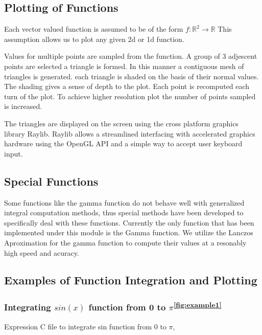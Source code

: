 \documentclass[12pt]{article}
\begin{document}
\subsection{Plotting of Functions}

Each vector valued function is assumed to be of the form $f:\mathbb{R}^2 \rightarrow \mathbb{R}$ This assumption allows us to plot any given 2d or 1d function.

Values for multiple points are sampled from the function. A group of 3 adjescent points are selected a triangle is formed. In this manner a contiguous mesh of
triangles is generated. each triangle is shaded on the basis of their normal values. The shading gives a sense of depth to the plot. Each point is recomputed each
turn of the plot. To achieve higher resolution plot the number of points sampled is increased.

The triangles are displayed on the screen using the cross platform graphics library Raylib\cite{ad}. Raylib allows a streamlined interfacing with accelerated graphics
hardware using the OpenGL API and a simple way to accept user keyboard input.

\subsection{Special Functions}

Some functions like the gamma function do not behave well with generalized integral computation methods, thus special
methods have been developed to specifically deal with these functions. Currently the only function that has been implemented
under this module is the Gamma function. We utilize the Lanczos Aproximation\cite{aa} for the gamma function to compute their values at 
a resonably high speed and acuracy.

\subsection{Examples of Function Integration and Plotting}

\subsubsection{Integrating $sin(x)$ function from 0 to $\pi$\textsuperscript{\ref{fig:example1}}}

\begin{flushleft}
Expression C file to integrate sin function from 0 to $\pi$,
\end{flushleft}
\end{document}
